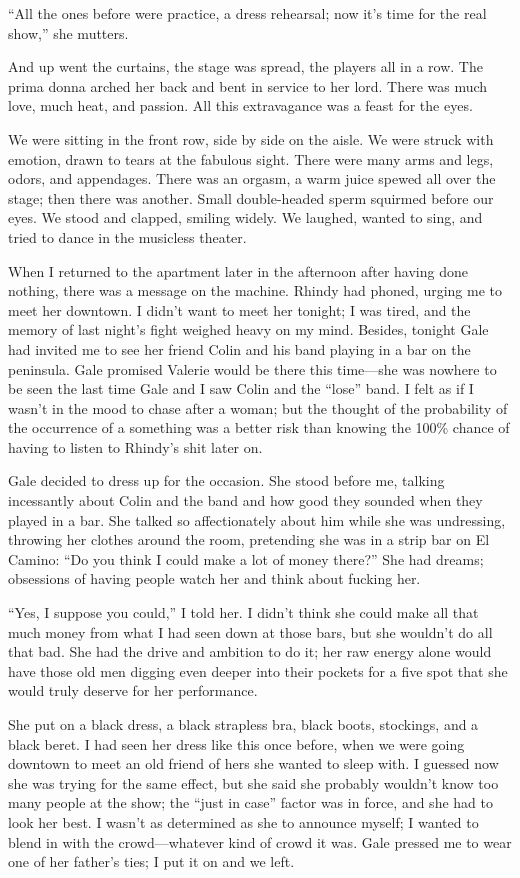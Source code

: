``All the ones before were practice, a dress rehearsal; now it's time
for the real show,'' she mutters.

And up went the curtains, the stage was spread, the players all in a
row. The prima donna arched her back and bent in service to her lord.
There was much love, much heat, and passion. All this extravagance was a
feast for the eyes.

We were sitting in the front row, side by side on the aisle. We were
struck with emotion, drawn to tears at the fabulous sight. There were
many arms and legs, odors, and appendages. There was an orgasm, a warm
juice spewed all over the stage; then there was another. Small
double-headed sperm squirmed before our eyes. We stood and clapped,
smiling widely. We laughed, wanted to sing, and tried to dance in the
musicless theater.

When I returned to the apartment later in the afternoon after having
done nothing, there was a message on the machine. Rhindy had phoned,
urging me to meet her downtown. I didn't want to meet her tonight; I was
tired, and the memory of last night's fight weighed heavy on my mind.
Besides, tonight Gale had invited me to see her friend Colin and his
band playing in a bar on the peninsula. Gale promised Valerie would be
there this time---she was nowhere to be seen the last time Gale and I
saw Colin and the ``lose'' band. I felt as if I wasn't in the mood to
chase after a woman; but the thought of the probability of the
occurrence of a something was a better risk than knowing the 100\%
chance of having to listen to Rhindy's shit later on.

Gale decided to dress up for the occasion. She stood before me, talking
incessantly about Colin and the band and how good they sounded when they
played in a bar. She talked so affectionately about him while she was
undressing, throwing her clothes around the room, pretending she was in
a strip bar on El Camino: ``Do you think I could make a lot of money
there?'' She had dreams; obsessions of having people watch her and think
about fucking her.

``Yes, I suppose you could,'' I told her. I didn't think she could make
all that much money from what I had seen down at those bars, but she
wouldn't do all that bad. She had the drive and ambition to do it; her
raw energy alone would have those old men digging even deeper into their
pockets for a five spot that she would truly deserve for her
performance.

She put on a black dress, a black strapless bra, black boots, stockings,
and a black beret. I had seen her dress like this once before, when we
were going downtown to meet an old friend of hers she wanted to sleep
with. I guessed now she was trying for the same effect, but she said she
probably wouldn't know too many people at the show; the ``just in case''
factor was in force, and she had to look her best. I wasn't as
determined as she to announce myself; I wanted to blend in with the
crowd---whatever kind of crowd it was. Gale pressed me to wear one of
her father's ties; I put it on and we left.

